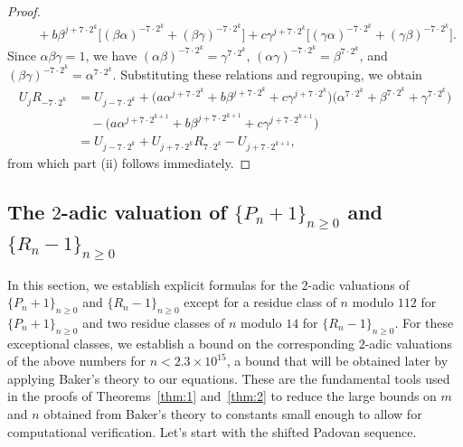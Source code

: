 \documentclass[11pt,a4paper]{article}
\numberwithin{equation}{section}
\numberwithin{table}{section}
\numberwithin{figure}{section}
\begin{document}
\begin{proof}
\begin{align*}
		&\quad + b\beta^{j+7\cdot 2^k}
		\big[(\beta\alpha)^{-7\cdot 2^k} 
		+ (\beta\gamma)^{-7\cdot 2^k}\big]
		 + c\gamma^{j+7\cdot 2^k}
		\big[(\gamma\alpha)^{-7\cdot 2^k} 
		+ (\gamma\beta)^{-7\cdot 2^k}\big].
	\end{align*}
	Since $\alpha\beta\gamma = 1$, we have 
	$(\alpha\beta)^{-7\cdot 2^k} = \gamma^{7\cdot 2^k}$, 
	$(\alpha\gamma)^{-7\cdot 2^k} = \beta^{7\cdot 2^k}$, 
	and $(\beta\gamma)^{-7\cdot 2^k} = \alpha^{7\cdot 2^k}$. 
	Substituting these relations and regrouping, we obtain
	\begin{align*}
		U_j R_{-7\cdot 2^k} 
		&= U_{j-7\cdot 2^k}
		 + \big(a\alpha^{j+7\cdot 2^k} 
		+ b\beta^{j+7\cdot 2^k} 
		+ c\gamma^{j+7\cdot 2^k}\big)
		\big(\alpha^{7\cdot 2^k} + \beta^{7\cdot 2^k} 
		+ \gamma^{7\cdot 2^k}\big)\\
		&\quad - \big(a\alpha^{j+7\cdot 2^{k+1}} 
		+ b\beta^{j+7\cdot 2^{k+1}} 
		+ c\gamma^{j+7\cdot 2^{k+1}}\big)\\
		&= U_{j-7\cdot 2^k} + U_{j+7\cdot 2^k}R_{7\cdot 2^k} 
		- U_{j+7\cdot 2^{k+1}},
	\end{align*}
	from which part (ii) follows immediately.
\end{proof}

\subsection{The $2$-adic valuation of $\{P_n+1\}_{n\ge 0}$ and $\{R_n-1\}_{n\ge 0}$}\label{sec:2adic}

In this section, we establish explicit formulas for the $2$-adic valuations of $\{P_n+1\}_{n\ge 0}$ and $\{R_n-1\}_{n\ge 0}$ except for a residue class of $n$ modulo $112$ for $\{P_n+1\}_{n\ge 0}$ and two residue classes of $n$ modulo $14$ for $\{R_n-1\}_{n\ge 0}$. For these exceptional classes, we establish a bound on the corresponding $2$-adic valuations of the above numbers for $n<2.3\times 10^{15}$, a bound that will be obtained later by applying Baker's theory to our equations. These are the fundamental tools used in the proofs of Theorems~\ref{thm:1} and~\ref{thm:2} to reduce the large bounds on $m$ and $n$ obtained from Baker's theory to constants small enough to allow for computational verification. Let's start with the shifted Padovan sequence.
\end{document}
